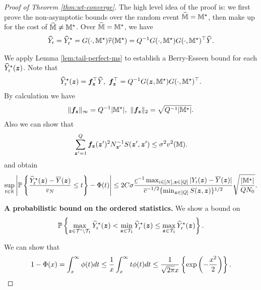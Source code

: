 \documentclass[12pt]{article}
\begin{document}
\begin{proof}[Proof of Theorem \ref{thm:wt-converge}]
The high level idea of the proof is: we first prove the non-asymptotic bounds over the random event $\widehat{{\mathbb{M}}} = {\mathbb{M}}^\star$, then make up for the cost of $\widehat{{\mathbb{M}}} \neq {\mathbb{M}}^\star$. Over $\widehat{{\mathbb{M}}} = {\mathbb{M}}^\star$, we have 
\begin{align*}
    \widehat{Y}_{\operatorname{r}} = \widehat{Y}^\star_{\operatorname{r}} = G(\cdot,{{\mathbb{M}}^\star}) {\widehat{\tau}}({\mathbb{M}}^\star) = Q^{-1}G(\cdot,{{\mathbb{M}}^\star})G(\cdot,{{\mathbb{M}}^\star})^\top {\widehat{Y}}.
\end{align*}

We apply Lemma \ref{lem:tail-perfect-ms} to establish a Berry-Esseen bound for each ${\widehat{Y}}^\star_{\operatorname{r}}({\boldsymbol{z}})$. Note that
\begin{align}\label{eqn:hY-r-star}
    {\widehat{Y}}^\star_{\operatorname{r}}({\boldsymbol{z}}) = {\boldsymbol{f}}_{{\boldsymbol{z}}}^\top {\widehat{Y}}, ~{\boldsymbol{f}}_{{\boldsymbol{z}}}^\top = Q^{-1}G({\boldsymbol{z}}, {\mathbb{M}}^\star) G(\cdot,{\mathbb{M}}^\star)^\top.
\end{align}
By calculation we have
\begin{align*}
    \|{\boldsymbol{f}}_{{\boldsymbol{z}}}\|_\infty = Q^{-1}|{\mathbb{M}}^\star|, ~\|{\boldsymbol{f}}_{{\boldsymbol{z}}}\|_2 = \sqrt{Q^{-1} |{\mathbb{M}}^\star|}.
\end{align*}
Also we can show that
\begin{align*}
    \sum_{{\boldsymbol{z}}'=1}^Q  {{\boldsymbol{f}}}_{{\boldsymbol{z}}}({\boldsymbol{z}}')^2 N_{{\boldsymbol{z}}'}^{-1} S({\boldsymbol{z}}',{\boldsymbol{z}}') \le \sigma^2 v^2({\mathbb{M}}).
\end{align*}
and obtain
\begin{align}\label{eqn:BE-marginal-t}
  \sup_{t\in{\mathbb{R}}} \left|{\mathbb{P}}\left\{\frac{{\widehat{Y}}^\star_{\operatorname{r}}({\boldsymbol{z}}) - \overline{Y}({\boldsymbol{z}})}{v_N}\le t\right\} - \Phi(t)\right| \le 2C\sigma   \frac{ \underline{c}^{-1} \max_{i\in[N],{\boldsymbol{z}}\in[Q]}|Y_i({\boldsymbol{z}})-\overline{Y}({\boldsymbol{z}})|}{ {\overline{c}^{-1/2} \{\min_{{\boldsymbol{z}}\in[Q]} S({\boldsymbol{z}},{\boldsymbol{z}})}\}^{1/2}} \sqrt{\frac{|{\mathbb{M}}^\star|}{QN_0}}.
\end{align}


   \textbf{A probabilistic bound on the ordered statistics.} We show a bound on
\begin{align*}
    {\mathbb{P}}\left\{\max_{{\boldsymbol{z}} \in  {\mathcal{T}}'\backslash{\mathcal{T}}_{1}}{\widehat{Y}}^\star_{\operatorname{r}}({\boldsymbol{z}}) <\min_{{\boldsymbol{z}}\in{\mathcal{T}}_{1}}{\widehat{Y}}^\star_{\operatorname{r}}({\boldsymbol{z}}) \le \max_{{\boldsymbol{z}}\in{\mathcal{T}}_{1}}{\widehat{Y}}^\star_{\operatorname{r}}({\boldsymbol{z}})\right\}.
\end{align*}



We can show that 
\begin{align*}
    1-\Phi(x) = \int_x^\infty \phi(t) dt \le \frac{1}{x}\int_x^\infty t\phi(t) dt \le \frac{1}{\sqrt{2\pi}x}\left\{\exp\left(-\frac{x^2}{2}\right)\right\}.
\end{align*}


\end{proof}
\end{document}
